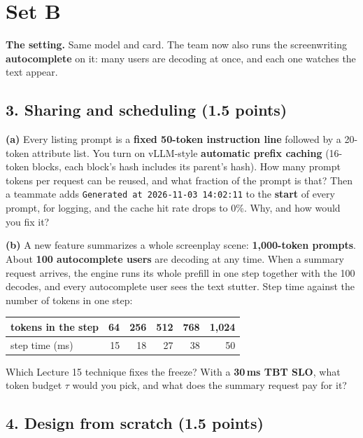 \documentclass[10pt]{article}
\newcommand{\answerbox}[1]{%
  \begin{tcolorbox}[colback=white, colframe=black!40, boxrule=0.4pt,
                    arc=0pt, height=#1]\end{tcolorbox}}
\begin{document}
\newpage
\section*{Set B}

\textbf{The setting.} Same model and card. The team now also runs the
screenwriting \textbf{autocomplete} on it: many users are decoding at
once, and each one watches the text appear.

\subsection*{3. Sharing and scheduling (1.5 points)}

\textbf{(a)} Every listing prompt is a \textbf{fixed 50-token instruction
line} followed by a 20-token attribute list. You turn on vLLM-style
\textbf{automatic prefix caching} (16-token blocks, each block's hash
includes its parent's hash). How many prompt tokens per request can be
reused, and what fraction of the prompt is that? Then a teammate adds
\texttt{Generated at 2026-11-03 14:02:11} to the \textbf{start} of every
prompt, for logging, and the cache hit rate drops to 0\%. Why, and how
would you fix it?
\answerbox{5cm}

\textbf{(b)} A new feature summarizes a whole screenplay scene:
\textbf{1{,}000-token prompts}. About \textbf{100 autocomplete users} are
decoding at any time. When a summary request arrives, the engine runs its
whole prefill in one step together with the 100 decodes, and every
autocomplete user sees the text stutter. Step time against the number of
tokens in one step:

\begin{center}
\begin{tabular}{lrrrrr}
\toprule
tokens in the step & 64 & 256 & 512 & 768 & 1{,}024 \\
\midrule
step time (ms) & 15 & 18 & 27 & 38 & 50 \\
\bottomrule
\end{tabular}
\end{center}

Which Lecture 15 technique fixes the freeze? With a \textbf{30\,ms TBT
SLO}, what token budget $\tau$ would you pick, and what does the summary
request pay for it?
\answerbox{5cm}

\newpage
\subsection*{4. Design from scratch (1.5 points)}
\end{document}
